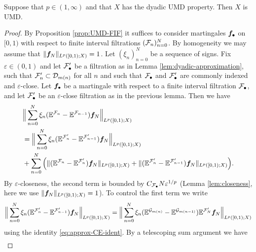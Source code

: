 \begin{thm}\label{thm:dyadic-UMD}
  Suppose that $p \in (1,\infty)$ and that $X$ has the dyadic UMD property.
  Then $X$ is UMD.
\end{thm}

\begin{proof}
  By Proposition \ref{prop:UMD-FIF} it suffices to consider martingales $\bm{f}_{\bullet}$ on $[0,1)$ with respect to finite interval filtrations $(\mathcal{F}_{n})_{n=0}^{N}$.
  By homogeneity we may assume that $\|\bm{f}_{N}\|_{L^p([0,1);X)} = 1$.
  Let $(\xi_{n})_{n=0}^{N}$ be a sequence of signs.
  Fix $\varepsilon \in (0,1)$ and let $\mathcal{F}'_{\bullet}$ be a filtration as in Lemma \ref{lem:dyadic-approximation}, such that $\mathcal{F}_{n}' \subset \mathcal{D}_{m(n)}$ for all $n$ and such that $\mathcal{F}_{\bullet}$ and $\mathcal{F}_{\bullet}'$ are commonly indexed and $\varepsilon$-close.
  Let $\bm{f}_{\bullet}$ be a martingale with respect to a finite interval filtration $\mathcal{F}_{\bullet}$, and let $\mathcal{F}'_{\bullet}$ be an $\varepsilon$-close filtration as in the previous lemma.
  Then we have
  \begin{equation*}
    \begin{aligned}
      &\Big\| \sum_{n=0}^{N} \xi_{n} (\mathbb{E}^{\mathcal{F}_{n}} - \mathbb{E}^{\mathcal{F}_{n-1}}) \bm{f}_{N} \Big\|_{L^p([0,1);X)} \\
      &= \Big\| \sum_{n=0}^{N} \xi_{n} (\mathbb{E}^{\mathcal{F}'_{n}} - \mathbb{E}^{\mathcal{F}'_{n-1}}) \bm{f}_{N} \Big\|_{L^p([0,1);X)} \\
      &+ \sum_{n=0}^{N} \Big( \| (\mathbb{E}^{\mathcal{F}_{n}} - \mathbb{E}^{\mathcal{F}'_{n}}) \bm{f}_{N}\|_{L^p([0,1);X)}
      +  \| (\mathbb{E}^{\mathcal{F}'_{n}} - \mathbb{E}^{\mathcal{F}'_{n-1}}) \bm{f}_{N} \|_{L^p([0,1);X)} \Big).
    \end{aligned}
  \end{equation*}
  By $\varepsilon$-closeness, the second term is bounded by $C_{\mathcal{F}_{\bullet}} N \varepsilon^{1/p}$ (Lemma \ref{lem:closeness}, here we use $\|\bm{f}_{N}\|_{L^p([0,1);X)} = 1$).
  To control the first term we write
  \begin{equation*}
    \Big\| \sum_{n=0}^{N} \xi_{n} (\mathbb{E}^{\mathcal{F}'_{n}} - \mathbb{E}^{\mathcal{F}'_{n-1}}) \bm{f}_{N} \Big\|_{L^p([0,1);X)}
    = \Big\| \sum_{n=0}^{N} \xi_{n} (\mathbb{E}^{\mathcal{G}_{m(n)}} - \mathbb{E}^{\mathcal{G}_{m(n-1)}}) \mathbb{E}^{\mathcal{F}'_{N}} \bm{f}_{N} \Big\|_{L^p([0,1);X)}
  \end{equation*}
  using the identity \eqref{eq:approx-CE-ident}.
  By a telescoping sum argument we have
  \begin{equation*}
    \begin{aligned}

\end{aligned}
\end{equation*}
\end{proof}
